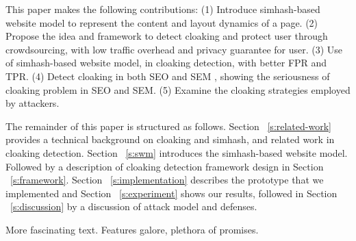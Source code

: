 This paper makes the following contributions:
(1) Introduce simhash-based website model to represent the content and layout
dynamics of a page.
(2) Propose the idea and framework to detect cloaking and protect user through crowdsourcing,
with low traffic overhead and privacy guarantee for user.
(3) Use of simhash-based website model, in cloaking detection, with better FPR
and TPR.
(4) Detect cloaking in both SEO and SEM , showing the seriousness of cloaking
problem in SEO and SEM.
(5) Examine the cloaking strategies employed by attackers.


The remainder of this paper is structured as follows. Section
~\autoref{s:related-work} provides a
technical background on cloaking and simhash, and related work in cloaking
detection. Section ~\autoref{s:swm} introduces the simhash-based website model.
Followed by a description of cloaking detection framework design in 
Section ~\autoref{s:framework}. Section ~\autoref{s:implementation} describes the 
prototype that we implemented and Section ~\autoref{s:experiment} shows our results,
followed in  Section ~\autoref{s:discussion} by a discussion of attack
model and defenses.



More fascinating text. Features galore, plethora of promises.\\



